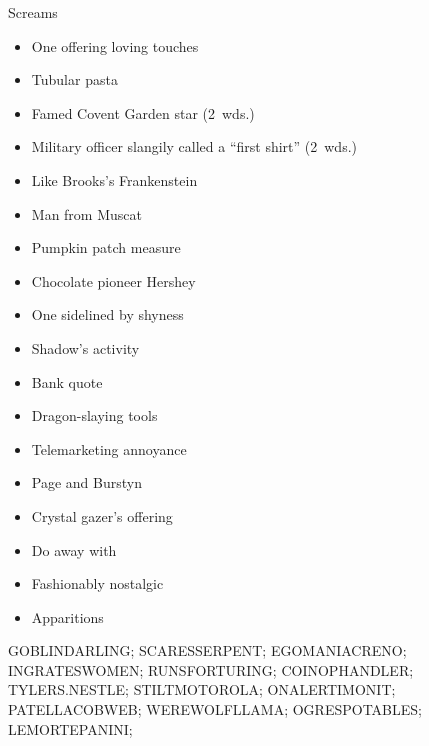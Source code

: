 {\begin{itemize}
        Screams
    \end{itemize}
  \item
    \begin{itemize}
      \item
        One offering loving touches
      \item
        Tubular pasta
      \item
        Famed Covent Garden star (2~wds.)
      \item
        Military officer slangily called a ``first shirt'' (2~wds.)
      \item
        Like Brooks's Frankenstein
    \end{itemize}
  \item
    \begin{itemize}
      \item
        Man from Muscat
      \item
        Pumpkin patch measure
      \item
        Chocolate pioneer Hershey
      \item
        One sidelined by shyness
      \item
        Shadow's activity
    \end{itemize}
  \item
    \begin{itemize}
      \item
        Bank quote
      \item
        Dragon-slaying tools
      \item
        Telemarketing annoyance
      \item
        Page and Burstyn
    \end{itemize}
  \item
    \begin{itemize}
      \item
        Crystal gazer's offering
      \item
        Do away with
      \item
        Fashionably nostalgic
    \end{itemize}
  \item
    \begin{itemize}
      \item
        Apparitions
    \end{itemize}
}{%
  \puzzlerow GOBLINDARLING;
  \puzzlerow SCARESSERPENT;
  \puzzlerow EGOMANIACRENO;
  \puzzlerow INGRATESWOMEN;
  \puzzlerow RUNSFORTURING;
  \puzzlerow COINOPHANDLER;
  \puzzlerow TYLERS.NESTLE;
  \puzzlerow STILTMOTOROLA;
  \puzzlerow ONALERTIMONIT;
  \puzzlerow PATELLACOBWEB;
  \puzzlerow WEREWOLFLLAMA;
  \puzzlerow OGRESPOTABLES;
  \puzzlerow LEMORTEPANINI;
}
